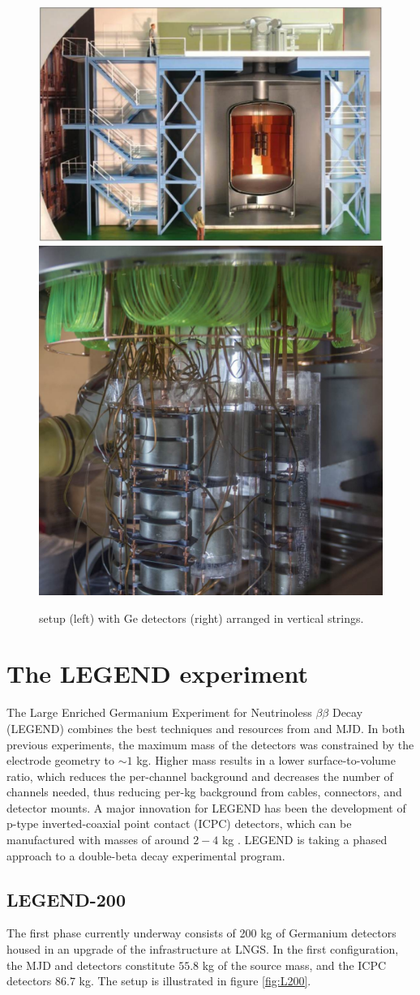 \begin{figure}
\centering
\includegraphics[height=0.385\columnwidth]{ch2/figs/gerda_setup.pdf}
\qquad
\includegraphics[height=0.385\columnwidth]{ch2/figs/gerdastrings.pdf}
\caption{{\Gerda} setup (left) with Ge detectors (right) arranged in vertical strings.}
\label{ch2_fig_gerda_setup}
\end{figure}
  
\section{The LEGEND experiment}
The Large Enriched Germanium Experiment for Neutrinoless $\beta\beta$ Decay (LEGEND) combines the best techniques and resources from {\Gerda} and MJD. In both previous experiments, the maximum mass of the detectors was constrained by the electrode geometry to $\sim1$ kg. Higher mass results in a lower surface-to-volume ratio, which reduces the per-channel background and decreases the number of channels needed, thus reducing per-kg background from cables, connectors, and detector mounts. A major innovation for LEGEND has been the development of p-type inverted-coaxial point contact (ICPC) detectors, which can be manufactured with masses of around $2-4$ kg \cite{COOPER201125}. LEGEND is taking a phased approach to a double-beta decay experimental program.

\subsection{LEGEND-200}
The first phase currently underway consists of 200 kg of Germanium detectors housed in an upgrade of the {\Gerda} infrastructure at LNGS. In the first configuration, the MJD and {\Gerda} detectors constitute $55.8$ kg of the source mass, and the ICPC detectors $86.7$ kg. The setup is illustrated in figure \ref{fig:L200}. 

